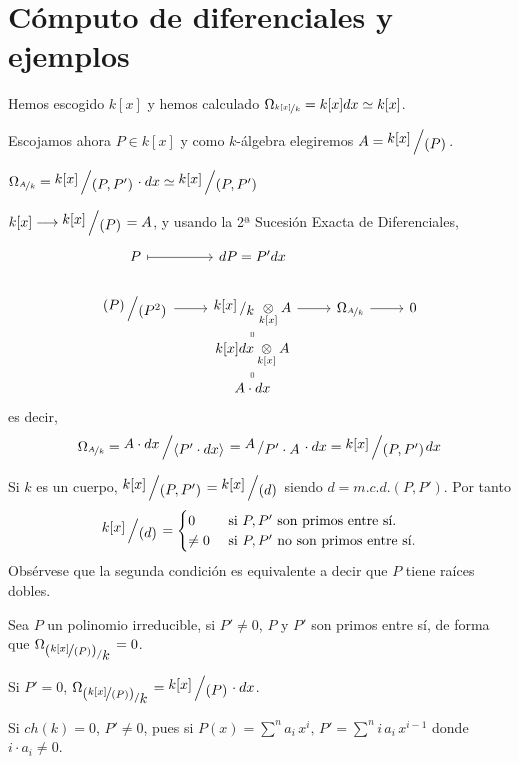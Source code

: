 \section{C\'omputo de diferenciales y ejemplos}
Hemos escogido $k[x]$ y hemos calculado $\Omega_{\nicefrac{k[x]}{k}} = k[x] dx \simeq k[x]$.

Escojamos ahora $P \in k[x]$ y como $k$-\'algebra elegiremos $A = \modulo{k[x]}{(P)}$.
\begin{prop}
    $\Omega_{\nicefrac{A}{k}} = \modulo{k[x]}{(P, P')}\cdot dx \simeq \modulo{k[x]}{(P, P')}$
\end{prop}
\begin{dem}
    $k[x] \longrightarrow \modulo{k[x]}{(P)} = A$, y usando la 2ª Sucesi\'on Exacta de Diferenciales,
    $$\bt 
    P \rarmaps & dP = P' dx
    \\ \modulo{(P)}{(P^2)} \rar & \modulo{k[x]}{k} \underset{k[x]}{\otimes} A \rar & \Omega_{\nicefrac{A}{k}} \rar & 0 \\[-5mm]
    & k[x] dx \arrow[equal]{u} \underset{k[x]}{\otimes} A & & \\[-5mm] 
    & \arrow[equal]{u} A\cdot dx
    \et$$
    es decir, 
    $$\Omega_{\nicefrac{A}{k}}  = \modulo{A\cdot dx}{ \langle P' \cdot dx \rangle} = \modulo{A}{P'\cdot A} \cdot dx =  \modulo{k[x]}{(P, P')} dx$$
\end{dem}
\begin{cor}
    Si $k$ es un cuerpo, $\modulo{k[x]}{(P, P')}= \modulo{k[x]}{(d)}$ siendo $d=m.c.d.(P,P')$. Por tanto 
    $$\modulo{k[x]}{(d)} = \begin{cases}
        0 & \text{ si } P,P' \text{ son primos entre s\'i.} \\
        \neq 0  & \text{ si } P,P' \text{ no son primos entre s\'i.} 
    \end{cases}$$
    Obs\'ervese que la segunda condici\'on es equivalente a decir que $P$ tiene ra\'ices dobles. 

    Sea $P$ un polinomio irreducible, si $P'\neq 0$, $P$ y $P'$ son primos entre s\'i, de forma que $\Omega_{\modulo{(\nicefrac{k[x]}{(P)})}{k}}=0$. 

    Si $P'=0$, $\Omega_{\modulo{(\nicefrac{k[x]}{(P)})}{k}}=\modulo{k[x]}{(P)} \cdot dx$. 

    Si $ch(k) = 0$, $P' \neq 0$, pues si $P(x) = \sum^n a_i \, x^i, \, P'=\sum^n i\,  a_i\,  x^{i-1}$ donde $i \cdot a_i \neq 0$.

\end{cor}
